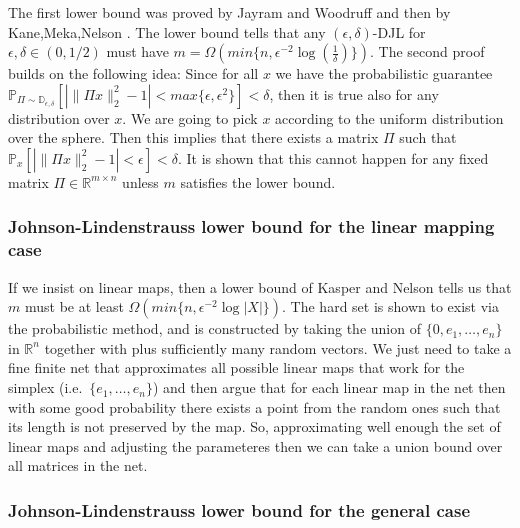 \documentclass[11pt]{article}
\newcommand{\R}{\mathbb{R}}
\begin{document}
The first lower bound was proved by Jayram and Woodruff \cite{Jayram} and then by Kane,Meka,Nelson \cite{Meka}. The lower bound tells that any $(\epsilon,\delta)$-DJL for $\epsilon,\delta \in (0,1/2)$ must have $m = \Omega( min\{n, \epsilon^{-2} \log(\frac{1}{\delta})\})$. The second proof builds on the following idea: Since for all $x$ we have the probabilistic guarantee  $\mathbb{P}_{\Pi \sim\mathbb{D}_{\epsilon,\delta} } [ | \| \Pi x \|_2^2 -1| < max\{ \epsilon, \epsilon^2 \}] < \delta$, then it is true also for any distribution over $x$. We are going to pick $x$ according to the uniform distribution over the sphere. Then this implies  that there exists a matrix $\Pi$ such that $\mathbb{P}_x[ | \|\Pi x \|_2^2 -1| < \epsilon] < \delta $. It is shown that this cannot happen for any fixed matrix $\Pi\in\R^{m\times n}$ unless $m$ satisfies the lower bound.
 
\subsubsection{Johnson-Lindenstrauss lower bound for the linear mapping case } 

If we insist on linear maps, then a lower bound of Kasper and Nelson \cite{Larsen} tells us that $m$ must be at least $\Omega(min\{n, \epsilon^{-2} \log|X|\})$. The hard set is shown to exist via the probabilistic method, and is constructed by taking the union of $\{0,e_1,\ldots,e_n\}$ in $\R^n$ together with plus sufficiently many random vectors. We just need to take a fine finite net that approximates all possible linear maps that work for the simplex (i.e.\ $\{e_1,\ldots,e_n\}$) and then argue that for each linear map in the net then with some good probability there exists a point from the random ones such that its length is not preserved by the map. So, approximating well enough the set of linear maps and adjusting the parameteres then we can take a union bound over all matrices in the net.\\

\subsubsection{Johnson-Lindenstrauss lower bound for the general case } 
\end{document}
